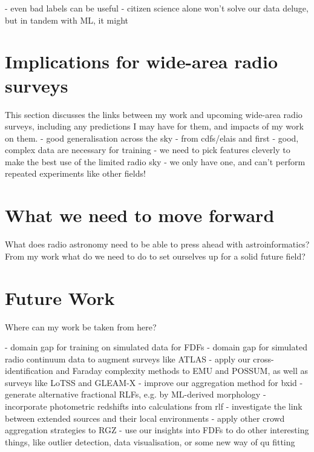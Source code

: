     - even bad labels can be useful
    - citizen science alone won't solve our data deluge, but in tandem with ML, it might

\section{Implications for wide-area radio surveys}
\label{sec:implications-wide-area-radio-surveys}

    This section discusses the links between my work and upcoming wide-area radio surveys, including any predictions I may have for them, and impacts of my work on them.
    - good generalisation across the sky - from cdfs/elais and first
    - good, complex data are necessary for training
    - we need to pick features cleverly to make the best use of the limited radio sky - we only have one, and can't perform repeated experiments like other fields!

\section{What we need to move forward}
\label{sec:moving-forward}
    
    What does radio astronomy need to be able to press ahead with astroinformatics? From my work what do we need to do to set ourselves up for a solid future field?

\section{Future Work}
\label{sec:future}

    Where can my work be taken from here?

    - domain gap for training on simulated data for FDFs
    - domain gap for simulated radio continuum data to augment surveys like ATLAS
    - apply our cross-identification and Faraday complexity methods to EMU and POSSUM, as well as surveys like LoTSS and GLEAM-X
    - improve our aggregation method for bxid
    - generate alternative fractional RLFs, e.g. by ML-derived morphology
    - incorporate photometric redshifts into calculations from rlf
    - investigate the link between extended sources and their local environments
    - apply other crowd aggregation strategies to RGZ
    - use our insights into FDFs to do other interesting things, like outlier detection, data visualisation, or some new way of qu fitting
